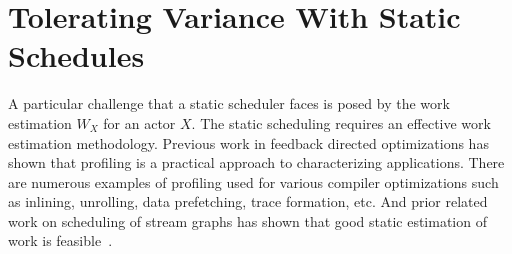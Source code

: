 \section{Tolerating Variance With Static Schedules}

A particular challenge that a static scheduler faces is posed by the
work estimation $W_X$ for an actor $X$. The static scheduling requires
an effective work estimation methodology. Previous work in feedback
directed optimizations has shown that profiling is a practical
approach to characterizing applications. There are numerous examples
of profiling used for various compiler optimizations such as inlining,
unrolling, data prefetching, trace formation, etc. And prior related
work on scheduling of stream graphs has shown that good static
estimation of work is
feasible~\cite{mgordon-asplos04,mgordon-asplos06}.


